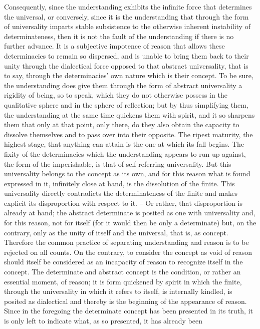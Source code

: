Consequently, since the understanding exhibits the infinite force that
determines the universal, or conversely, since it is the understanding that
through the form of universality imparts stable subsistence to the otherwise
inherent instability of determinateness, then it is not the fault of the
understanding if there is no further advance. It is a subjective impotence of
reason that allows these determinacies to remain so dispersed, and is unable
to bring them back to their unity through the dialectical force opposed
to that abstract universality, that is to say, through the determinacies’ own
nature which is their concept. To be sure, the understanding does give
them through the form of abstract universality a rigidity of being, so to
speak, which they do not otherwise possess in the qualitative sphere and in
the sphere of reflection; but by thus simplifying them, the understanding
at the same time quickens them with spirit, and it so sharpens them that
only at that point, only there, do they also obtain the capacity to dissolve
themselves and to pass over into their opposite. The ripest maturity, the
highest stage, that anything can attain is the one at which its fall begins.
The fixity of the determinacies which the understanding appears to run up
against, the form of the imperishable, is that of self-referring universality.
But this universality belongs to the concept as its own, and for this reason
what is found expressed in it, infinitely close at hand, is the dissolution of
the finite. This universality directly contradicts the determinateness of the
finite and makes explicit its disproportion with respect to it. – Or rather,
that disproportion is already at hand; the abstract determinate is posited as
one with universality and, for this reason, not for itself (for it would then
be only a determinate) but, on the contrary, only as the unity of itself and
the universal, that is, as concept.
Therefore the common practice of separating understanding and reason
is to be rejected on all counts. On the contrary, to consider the concept
as void of reason should itself be considered as an incapacity of reason to
recognize itself in the concept. The determinate and abstract concept is
the condition, or rather an essential moment, of reason; it is form quickened
by spirit in which the finite, through the universality in which it refers
to itself, is internally kindled, is posited as dialectical and thereby is the
beginning of the appearance of reason.
Since in the foregoing the determinate concept has been presented in its
truth, it is only left to indicate what, as so presented, it has already been
